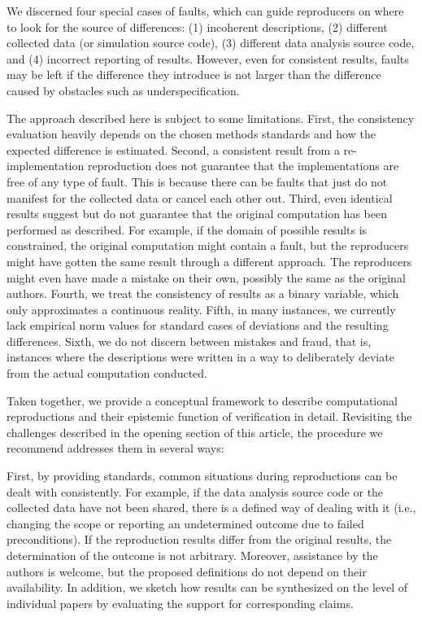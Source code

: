 \documentclass[authordate, meta]{jote-new-article}
\begin{document}
	We discerned four special cases of faults, which can guide reproducers on where to look for the source of differences: (1) incoherent descriptions, (2) different collected data (or simulation source code), (3) different data analysis source code, and (4) incorrect reporting of results. However, even for consistent results, faults may be left if the difference they introduce is not larger than the difference caused by obstacles such as underspecification.


	The approach described here is subject to some limitations. First, the consistency evaluation heavily depends on the chosen methods standards and how the expected difference is estimated. Second, a consistent result from a re-implementation reproduction does not guarantee that the implementations are free of any type of fault. This is because there can be faults that just do not manifest for the collected data or cancel each other out. Third, even identical results suggest but do not guarantee that the original computation has been performed as described. For example, if the domain of possible results is constrained, the original computation might contain a fault, but the reproducers might have gotten the same result through a different approach. The reproducers might even have made a mistake on their own, possibly the same as the original authors. Fourth, we treat the consistency of results as a binary variable, which only approximates a continuous reality. Fifth, in many instances, we currently lack empirical norm values for standard cases of deviations and the resulting differences. Sixth, we do not discern between mistakes and fraud, that is, instances where the descriptions were written in a way to deliberately deviate from the actual computation conducted.


	Taken together, we provide a conceptual framework to describe computational reproductions and their epistemic function of verification in detail. Revisiting the challenges described in the opening section of this article, the procedure we recommend addresses them in several ways: 
	
	First, by providing standards, common situations during reproductions can be dealt with consistently. For example, if the data analysis source code or the collected data have not been shared, there is a defined way of dealing with it (i.e., changing the scope or reporting an undetermined outcome due to failed preconditions). If the reproduction results differ from the original results, the determination of the outcome is not arbitrary. Moreover, assistance by the authors is welcome, but the proposed definitions do not depend on their availability. In addition, we sketch how results can be synthesized on the level of individual papers by evaluating the support for corresponding claims. 
	
\end{document}
